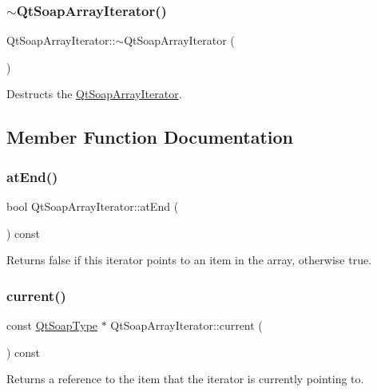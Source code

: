 \subsubsection{\texorpdfstring{$\sim$\+Qt\+Soap\+Array\+Iterator()}{~QtSoapArrayIterator()}}
{\footnotesize\ttfamily Qt\+Soap\+Array\+Iterator\+::$\sim$\+Qt\+Soap\+Array\+Iterator (\begin{DoxyParamCaption}{ }\end{DoxyParamCaption})}

Destructs the \mbox{\hyperlink{class_qt_soap_array_iterator}{Qt\+Soap\+Array\+Iterator}}. 

\subsection{Member Function Documentation}
\mbox{\label{class_qt_soap_array_iterator_af74296777226aacd505b7969ad4e7e54}} 
\subsubsection{\texorpdfstring{at\+End()}{atEnd()}}
{\footnotesize\ttfamily bool Qt\+Soap\+Array\+Iterator\+::at\+End (\begin{DoxyParamCaption}{ }\end{DoxyParamCaption}) const}

Returns false if this iterator points to an item in the array, otherwise true. \mbox{\label{class_qt_soap_array_iterator_a7c7a7589b11e80117564e0a4191a6f7e}} 
\subsubsection{\texorpdfstring{current()}{current()}}
{\footnotesize\ttfamily const \mbox{\hyperlink{class_qt_soap_type}{Qt\+Soap\+Type}} $\ast$ Qt\+Soap\+Array\+Iterator\+::current (\begin{DoxyParamCaption}{ }\end{DoxyParamCaption}) const}

Returns a reference to the item that the iterator is currently pointing to. \mbox{\label{class_qt_soap_array_iterator_aaf9f8f6b2c10867889f18f5ca7f2f379}} 
